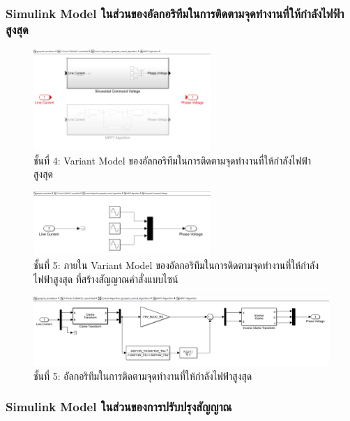 \documentclass[11pt,a4paper]{article}
\begin{document}
\subsubsection{Simulink Model ในส่วนของอัลกอริทึมในการติดตามจุดทำงานที่ให้กำลังไฟฟ้าสูงสุด}

\begin{figure}[H]
    \centering
    \includegraphics[width=0.6\textwidth]{l4-mppt.png}
    \caption{ชั้นที่ 4: Variant Model ของอัลกอริทึมในการติดตามจุดทำงานที่ให้กำลังไฟฟ้าสูงสุด}
\end{figure}

\begin{figure}[H]
    \centering
    \includegraphics[width=0.6\textwidth]{l5-sin.png}
    \caption{ชั้นที่ 5: ภายใน Variant Model ของอัลกอริทึมในการติดตามจุดทำงานที่ให้กำลังไฟฟ้าสูงสุด ที่สร้างสัญญาณคำสั่งแบบไซน์}
\end{figure}

\begin{figure}[H]
    \centering
    \includegraphics[width=\textwidth]{l5-mppt.png}
    \caption{ชั้นที่ 5: อัลกอริทึมในการติดตามจุดทำงานที่ให้กำลังไฟฟ้าสูงสุด}
\end{figure}

\subsubsection{Simulink Model ในส่วนของการปรับปรุงสัญญาณ}
\end{document}
